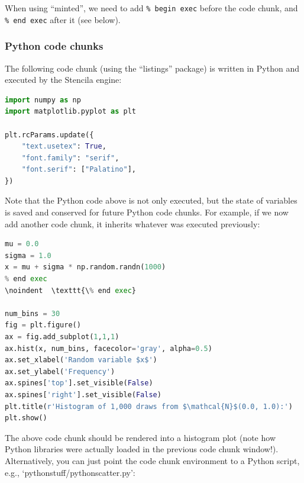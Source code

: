\documentclass[12pt]{article}
\begin{document}
When using ``minted'', we need to add \texttt{\% begin
  exec} before the code chunk, and \texttt{\% end
  exec} after it (see below).

\subsubsection*{Python code chunks}

The following code chunk (using the ``listings'' package) is written
in Python and executed by the Stencila engine:\\

\begin{lstlisting}[language=Python, style=pythoncustomstyle-exec,
  caption={Customizing some aspects of plotting before it is actually
    done.}]
import numpy as np
import matplotlib.pyplot as plt

plt.rcParams.update({
    "text.usetex": True,
    "font.family": "serif",
    "font.serif": ["Palatino"],
})
\end{lstlisting}

Note that the Python code above is not only executed, but the state of
variables is saved and conserved for future Python code chunks.
For example, if we now add another code chunk, it inherits whatever
was executed previously:\\

\begin{lstlisting}[language=Python, style=pythoncustomstyle,
  caption={Histogram of 1,000 random draws from $\mathcal{N}$(0.0, 1.0).}]
mu = 0.0
sigma = 1.0
x = mu + sigma * np.random.randn(1000)
% end exec
\noindent  \texttt{\% end exec}

num_bins = 30
fig = plt.figure()
ax = fig.add_subplot(1,1,1)
ax.hist(x, num_bins, facecolor='gray', alpha=0.5)
ax.set_xlabel('Random variable $x$')
ax.set_ylabel('Frequency')
ax.spines['top'].set_visible(False)
ax.spines['right'].set_visible(False)
plt.title(r'Histogram of 1,000 draws from $\mathcal{N}$(0.0, 1.0):')
plt.show()
\end{lstlisting}

The above code chunk should be rendered into a histogram plot (note
how Python libraries were actually loaded in the previous code chunk
window!).
Alternatively, you can just point the code chunk environment to a
Python script, e.g., `pythonstuff/pythonscatter.py':\\


\end{document}
